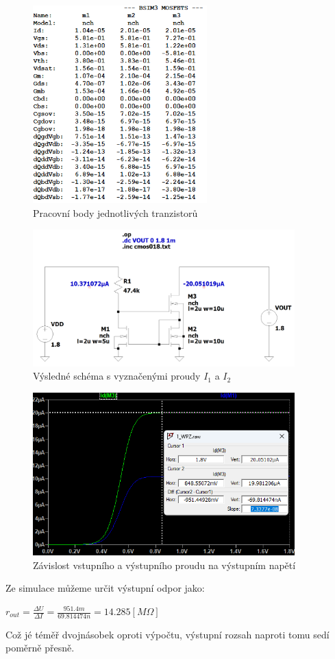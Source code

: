 \begin{figure}[h!]
    \centering
    \includegraphics[width=0.6\textwidth]{text/img/WPZ-op-OL.png}
    \caption{\label{fig:WPZ-op-OL} Pracovní body jednotlivých tranzistorů}
\end{figure}

\begin{figure}[h!]
    \centering
    \includegraphics[width=0.9\textwidth]{text/img/WPZ-op-sch.png}
    \caption{\label{fig:WPZ-op-sch} Výsledné schéma s vyznačenými proudy \(I_1\) a \(I_2\)}
\end{figure}

\begin{figure}[h!]
    \centering
    \includegraphics[width=0.9\textwidth]{text/img/WPZ-dc-graf.png}
    \caption{\label{fig:WPZ-dc-graf} Závislost vstupního a výstupního proudu na výstupním napětí}
\end{figure}

Ze simulace můžeme určit výstupní odpor jako:
\begin{center}
    \large
    \(
        r_{out} = \frac{\Delta U}{\Delta I} = \frac{951.4m}{69.814474n} = 14.285 [M\Omega] 
    \)
\end{center}

Což jé téměř dvojnásobek oproti výpočtu, výstupní rozsah naproti tomu sedí poměrně přesně.